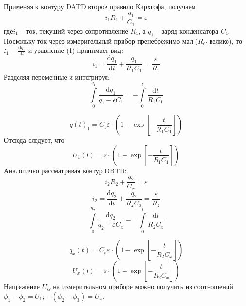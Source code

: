 \documentclass[a4paper,12pt]{extarticle}
\begin{document}
Применяя к контуру DATD второе правило Кирхгофа, получаем
\begin{equation}
i_1 R_1 + \frac{q_1}{C_1}=\varepsilon
\end{equation}
где$ i_1$ -- ток, текущий через сопротивление $R_1$, а $q_1$ -- заряд конденсатора $C_1$. 
Поскольку ток через измерительный прибор пренебрежимо мал ($R_G$ велико), то $i_1=\frac{\mathrm{d}q_1 }{\mathrm{d} t}$ и уравнение (1) принимает вид:
\begin{equation}
i_1=\frac{\mathrm{d}q_1 }{\mathrm{d} t} + \frac{q_1}{R_1 C_1}=\frac{\varepsilon}{R_1}
\end{equation}
Разделяя переменные и интегрируя:
\begin{equation}
 \int \limits^{q_1}_0 \frac{\mathrm{d} q_1}{q_1-\epsilon C_1}=-\int \limits^t_0 \frac{\mathrm{d} t}{R_1 C_1}
\end{equation}

\begin{equation}
	q(t)_1 = C_1 \varepsilon \cdot 
	\left( 
		1-
		\exp\left[		
			-\frac{t}{R_1 C_1}
		\right]
	\right)
\end{equation}
Отсюда следует, что
\begin{equation}
	U_1(t) = \varepsilon \cdot 
	\left( 
		1-
		\exp\left[		
			-\frac{t}{R_1 C_1}
		\right]
	\right)
\end{equation}
Аналогично рассматривая контур DBTD:
\begin{equation}
i_2 R_2 + \frac{q_2}{C_x}=\varepsilon
\end{equation}
\begin{equation}
i_2=\frac{\mathrm{d}q_2 }{\mathrm{d} t} + \frac{q_2}{R_2 C_x}=\frac{\varepsilon}{R_2}
\end{equation}
\begin{equation}
 \int \limits^{q_2}_0 \frac{\mathrm{d} q_2}{q_2-\varepsilon C_x}=-\int \limits^t_0 \frac{\mathrm{d} t}{R_2 C_x}
\end{equation}

\begin{equation}
q_x(t) = C_x \varepsilon \cdot 
\left( 
	1-
	\exp\left[		
		-\frac{t}{R_2 C_x}
	\right]
\right)
\end{equation}
\begin{equation}
U_x(t) =  \varepsilon \cdot 
\left( 
	1- 
	\exp\left[
	{-\frac{t}{R_2 C_x}}
	\right]
\right)
\end{equation}
Напряжение $U_G$ на измерительном приборе можно получить из соотношений
$\phi_1-\phi_2=U_1$; $-(\phi_2-\phi_3)=U_x$.
\end{document}
